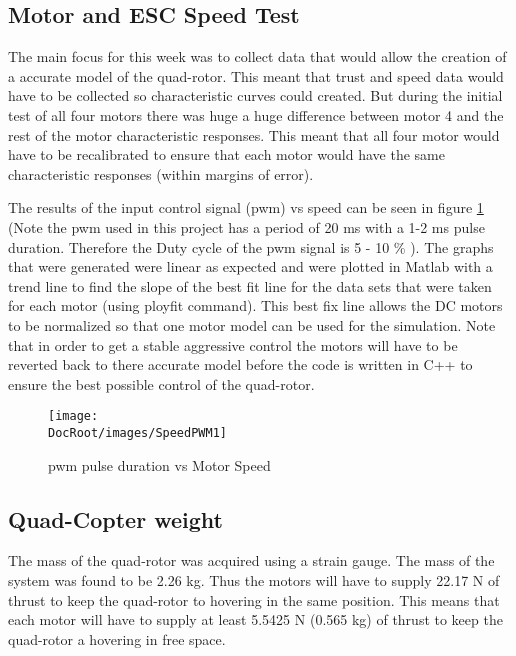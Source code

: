  \tocless\subsection{Motor and ESC Speed Test}
The main focus for this week was to collect data that would allow the creation of a accurate model of the quad-rotor. This meant  that trust and speed data would have to be collected so characteristic curves could created. But during the initial test of all four motors  there was huge a huge difference between motor 4 and the rest of the motor characteristic responses. This meant that all four motor would have to be recalibrated to ensure that each motor would have the same characteristic responses (within margins of error).

The results of the input control signal (\gls{pwm}) vs speed can be seen in figure \ref{fig: PWM Wavelength vs Speed for Axi Motor} (Note the \gls{pwm} used in this project has a period of  20 \si[mode=text]{\milli \second} with a 1-2 \si[mode = text]{\milli \second} pulse duration. Therefore the Duty cycle of the \gls{pwm} signal is 5 - 10 \% ). The graphs that were generated were linear as expected and were plotted in Matlab with a trend line to find the slope of the best fit line for the data sets that were taken for each motor (using ployfit command). This best fix line allows the DC motors to be normalized so that one motor model can be used for the simulation. Note that in order to get a stable aggressive control the motors will have to be reverted back to there accurate model before the code is written in C++ to ensure the best possible control of the quad-rotor.


\begin{figure}[h]
	\centering
	\texttt{[image: \\DocRoot/images/SpeedPWM1]}
	\caption{\gls{pwm} pulse duration vs Motor Speed}
	\label{fig: PWM Wavelength vs Speed for Axi Motor}
\end{figure}


 \tocless\subsection{Quad-Copter weight}
The mass of the quad-rotor was acquired using a strain gauge. The mass of the system was found to be 2.26 \si[mode = text]{\kilogram}. Thus the motors will have to supply 22.17  \si[mode = text]{\newton} of thrust to keep the quad-rotor to hovering in the same position. This means that each motor will have to supply at least 5.5425 \si[mode = text]{ \newton} (0.565 \si[mode =text]{\kilogram}) of thrust to keep the quad-rotor a hovering in free space.


